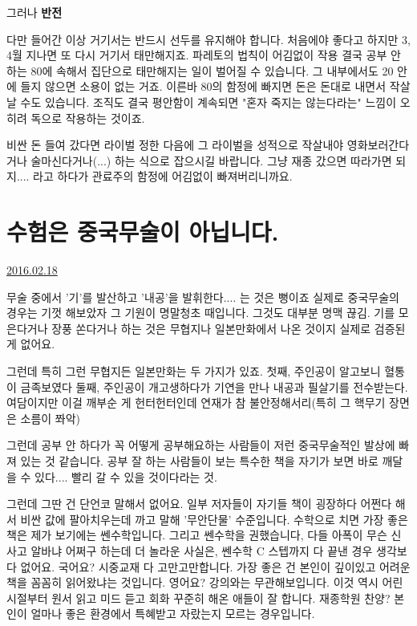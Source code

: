 그러나 \textbf{반전}
\vspace{5mm}

다만 들어간 이상 거기서는 반드시 선두를 유지해야 합니다.
처음에야 좋다고 하지만 3, 4월 지나면 또 다시 거기서 태만해지죠. 파레토의 법칙이 어김없이 작용
결국 공부 안 하는 80에 속해서 집단으로 태만해지는 일이 벌어질 수 있습니다.
그 내부에서도 20 안에 들지 않으면 소용이 없는 거죠.
이른바 80의 함정에 빠지면 돈은 돈대로 내면서 작살날 수도 있습니다.
조직도 결국 평안함이 계속되면 "혼자 죽지는 않는다라는" 느낌이 오히려 독으로 작용하는 것이죠.
\vspace{5mm}

비싼 돈 들여 갔다면 라이벌 정한 다음에 그 라이벌을 성적으로 작살내야 영화보러간다거나 술마신다거나(...) 하는 식으로 잡으시길 바랍니다.
그냥 재종 갔으면 따라가면 되지.... 라고 하다가 관료주의 함정에 어김없이 빠져버리니까요.
\vspace{5mm}








\section{수험은 중국무술이 아닙니다.}
\href{https://www.kockoc.com/Apoc/640886}{2016.02.18}

\vspace{5mm}

무술 중에서 '기'를 발산하고 '내공'을 발휘한다.... 는 것은 뻥이죠
실제로 중국무술의 경우는 기껏 해보았자 그 기원이 명말청초 때입니다. 그것도 대부분 명맥 끊김.
기를 모은다거나 장풍 쏜다거나 하는 것은 무협지나 일본만화에서 나온 것이지 실제로 검증된 게 없어요.
\vspace{5mm}

그런데 특히 그런 무협지든 일본만화는 두 가지가 있죠.
첫째, 주인공이 알고보니 혈통이 금족보였다
둘째, 주인공이 개고생하다가 기연을 만나 내공과 필살기를 전수받는다.
여담이지만 이걸 깨부순 게 헌터헌터인데 연재가 참 불안정해서리(특히 그 핵무기 장면은 소름이 쫘악)
\vspace{5mm}

그런데 공부 안 하다가 꼭 어떻게 공부해요하는 사람들이 저런 중국무술적인 발상에 빠져 있는 것 같습니다.
공부 잘 하는 사람들이 보는 특수한 책을 자기가 보면 바로 깨달을 수 있다.... 빨리 갈 수 있을 것이다라는 것.
\vspace{5mm}

그런데 그딴 건 단언코 말해서 없어요.
일부 저자들이 자기들 책이 굉장하다 어쩐다 해서 비싼 값에 팔아치우는데 까고 말해 '무안단물' 수준입니다.
수학으로 치면 가장 좋은 책은 제가 보기에는 쎈수학입니다. 그리고 쎈수학을 권했습니다,
다들 아폭이 무슨 신사고 알바냐 어쩌구 하는데 더 놀라운 사실은, 쎈수학 C 스텝까지 다 끝낸 경우 생각보다 없어요.
국어요? 시중교재 다 고만고만합니다. 가장 좋은 건 본인이 깊이있고 어려운 책을 꼼꼼히 읽어왔냐는 것입니다.
영어요? 강의와는 무관해보입니다. 이것 역시 어린 시절부터 원서 읽고 미드 듣고 회화 꾸준히 해온 애들이 잘 합니다.
재종학원 찬양? 본인이 얼마나 좋은 환경에서 특혜받고 자랐는지 모르는 경우입니다.
\vspace{5mm}


